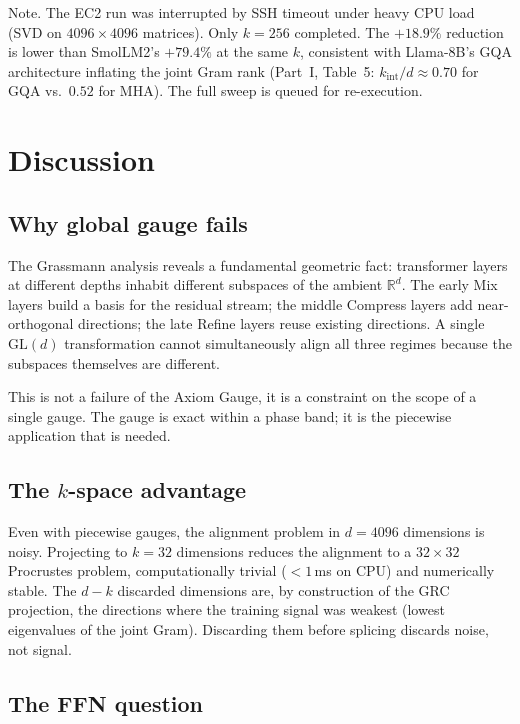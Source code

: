 \documentclass[11pt]{article}
\begin{document}
Note. The EC2 run was interrupted by SSH timeout under heavy
CPU load (SVD on $4096\times4096$ matrices). Only $k{=}256$ completed.
The $+18.9\%$ reduction is lower than SmolLM2's $+79.4\%$ at the same
$k$, consistent with Llama-8B's GQA architecture inflating the joint
Gram rank (Part~I, Table~5: $k_{\mathrm{int}}/d \approx 0.70$ for GQA
vs.\ $0.52$ for MHA). The full sweep is queued for re-execution.

\section{Discussion}
\label{sec:discussion}

\subsection{Why global gauge fails}

The Grassmann analysis reveals a fundamental geometric fact:
transformer layers at different depths inhabit different subspaces
of the ambient $\mathbb{R}^d$. The early Mix layers build a basis for
the residual stream; the middle Compress layers add near-orthogonal
directions; the late Refine layers reuse existing directions. A single
$\mathrm{GL}(d)$ transformation cannot simultaneously align all three
regimes because the subspaces themselves are different.

This is not a failure of the Axiom Gauge, it is a constraint on the
scope of a single gauge. The gauge is exact within a phase band;
it is the piecewise application that is needed.

\subsection{The $k$-space advantage}

Even with piecewise gauges, the alignment problem in $d{=}4096$
dimensions is noisy. Projecting to $k{=}32$ dimensions reduces the
alignment to a $32\times32$ Procrustes problem, computationally
trivial ($<1$\,ms on CPU) and numerically stable. The $d-k$ discarded
dimensions are, by construction of the GRC projection, the directions
where the training signal was weakest (lowest eigenvalues of the
joint Gram). Discarding them before splicing discards noise, not
signal.

\subsection{The FFN question}
\end{document}
